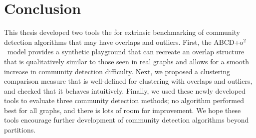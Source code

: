 \documentclass[review,los,12pt]{ryethesis}
\newcommand{\abcdoo}{{ABCD+o$^2$}}
\begin{document}
\chapter{Conclusion}
This thesis developed two tools the for extrinsic benchmarking of community detection algorithms that may have overlaps and outliers.
First, the \abcdoo\ model provides a synthetic playground that can recreate an overlap structure that is qualitatively similar to those seen in real graphs and allows for a smooth increase in community detection difficulty.
Next, we proposed a clustering comparison measure that is well-defined for clustering with overlaps and outliers, and checked that it behaves intuitively.
Finally, we used these newly developed tools to evaluate three community detection methods; no algorithm performed best for all graphs, and there is lots of room for improvement.
We hope these tools encourage further development of community detection algorithms beyond partitions.
\end{document}
